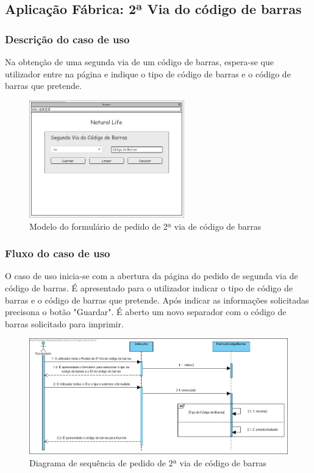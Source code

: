 \subsection{Aplicação Fábrica: 2ª Via do código de barras}
\subsubsection*{Descrição do caso de uso}
Na obtenção de uma segunda via de um código de barras, espera-se que utilizador entre na página e indique o tipo de código de barras e o código de barras que pretende. 

\begin{figure}[H] 
	\begin{center}
		\includegraphics[width=0.60\textwidth,keepaspectratio]{figuras/Diagramas_vp/DI_Fabrica_6_2_Via_Codigo_de_Barras.jpg}
		\caption{Modelo do formulário de pedido de 2ª via de código de barras}
		\label{fig:di_2_via} 
	\end{center}
\end{figure}

\subsubsection*{Fluxo do caso de uso}
O caso de uso inicia-se com a abertura da página do pedido de segunda via de código de barras. É apresentado para o utilizador indicar o tipo de código de barras e o código de barras que pretende. Após indicar as informações solicitadas precisona o botão "Guardar". É aberto um novo separador com o código de barras solicitado para imprimir.

\begin{figure}[H] 
	\begin{center}
		\includegraphics[width=\textwidth,keepaspectratio]{figuras/Diagramas_vp/SD_Fabrica_6_2_Via_Codigo_de_Barras.jpg}
		\caption{Diagrama de sequência de pedido de 2ª via de código de barras}
		\label{fig:sd_2_via} 
	\end{center}
\end{figure}